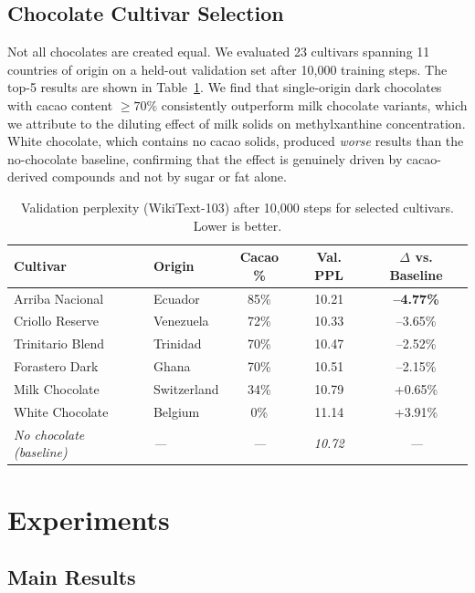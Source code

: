 \documentclass[11pt,a4paper]{article}
\begin{document}
\subsection{Chocolate Cultivar Selection}

Not all chocolates are created equal. We evaluated 23 cultivars spanning 11 countries of origin on a held-out validation set after 10,000 training steps. The top-5 results are shown in Table~\ref{tab:cultivars}. We find that single-origin dark chocolates with cacao content $\geq 70\%$ consistently outperform milk chocolate variants, which we attribute to the diluting effect of milk solids on methylxanthine concentration. White chocolate, which contains no cacao solids, produced \emph{worse} results than the no-chocolate baseline, confirming that the effect is genuinely driven by cacao-derived compounds and not by sugar or fat alone.

\begin{table}[h]
\centering
\caption{Validation perplexity (WikiText-103) after 10,000 steps for selected cultivars. Lower is better.}
\label{tab:cultivars}
\begin{tabular}{llccc}
\toprule
\textbf{Cultivar} & \textbf{Origin} & \textbf{Cacao \%} & \textbf{Val. PPL} & \textbf{$\Delta$ vs. Baseline} \\
\midrule
Arriba Nacional & Ecuador & 85\% & 10.21 & \textbf{--4.77\%} \\
Criollo Reserve & Venezuela & 72\% & 10.33 & --3.65\% \\
Trinitario Blend & Trinidad & 70\% & 10.47 & --2.52\% \\
Forastero Dark & Ghana & 70\% & 10.51 & --2.15\% \\
Milk Chocolate & Switzerland & 34\% & 10.79 & +0.65\% \\
White Chocolate & Belgium & 0\% & 11.14 & +3.91\% \\
\textit{No chocolate (baseline)} & \textit{---} & \textit{---} & \textit{10.72} & \textit{---} \\
\bottomrule
\end{tabular}
\end{table}

\section{Experiments}

\subsection{Main Results}
\end{document}
